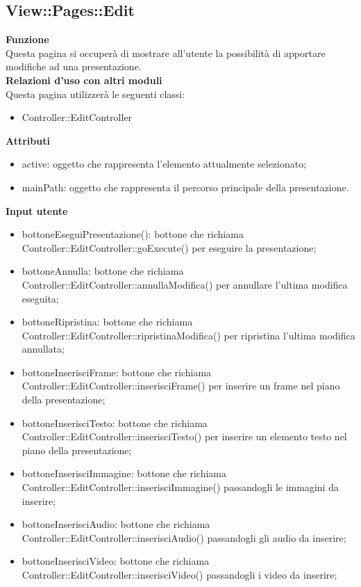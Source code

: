 {\subsection{View::Pages::Edit}{
	\textbf{Funzione}\\
	\indent Questa pagina si occuperà di mostrare all'utente la possibilità di apportare modifiche ad una presentazione.\\
	\textbf{Relazioni d'uso con altri moduli}\\
	\indent Questa pagina utilizzerà le seguenti classi:
	\begin{itemize}
		\item Controller::EditController
	\end{itemize}
	\textbf{Attributi}\\
		\begin{itemize}
			\item active: oggetto che rappresenta l'elemento attualmente selezionato;
			\item mainPath: oggetto che rappresenta il percorso principale della presentazione.
		\end{itemize}
	\textbf{Input utente}
	\begin{itemize}
		\item bottoneEseguiPresentazione(): bottone che richiama Controller::EditController::goExecute() per eseguire la presentazione;
		\item bottoneAnnulla: bottone che richiama Controller::EditController::annullaModifica() per annullare l'ultima modifica eseguita;
		\item bottoneRipristina: bottone che richiama Controller::EditController::ripristinaModifica() per ripristina l'ultima modifica annullata;
		\item bottoneInserisciFrame: bottone che richiama Controller::EditController::inserisciFrame() per inserire un frame nel piano della presentazione;
		\item bottoneInserisciTesto: bottone che richiama Controller::EditController::inserisciTesto() per inserire un elemento testo nel piano della presentazione;
		\item bottoneInserisciImmagine: bottone che richiama Controller::EditController::inserisciImmagine() passandogli le immagini da inserire;
		\item bottoneInserisciAudio: bottone che richiama Controller::EditController::inserisciAudio() passandogli gli audio da inserire;
		\item bottoneInserisciVideo: bottone che richiama Controller::EditController::inserisciVideo() passandogli i video da inserire;

\end{itemize}}}
